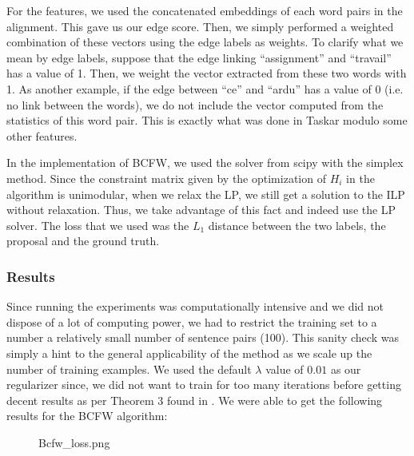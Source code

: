 For the features, we used the concatenated
embeddings of each word pairs in the alignment. This gave us our edge score.
Then, we simply performed a weighted combination of these vectors using the edge
labels as weights. To clarify what we mean by edge labels, suppose that the edge
linking ``assignment'' and ``travail'' has a value of 1. Then, we weight the
vector extracted from these two words with 1. As another example, if the edge
between ``ce'' and ``ardu'' has a value of 0 (i.e. no link between the words),
we do not include the vector computed from the statistics of this word pair.
This is exactly what was done in Taskar
\cite{taskarStructuredPredictionExtragradient} modulo some other features.

In the implementation of BCFW, we used the solver from scipy with the simplex
method. Since the constraint matrix given by the optimization of $H_i$ in the
algorithm is unimodular, when we relax the LP, we still get a solution to the
ILP without relaxation. Thus, we take advantage of this fact and indeed use the
LP solver. The loss that we used was the $L_1$
distance between the two labels, the proposal and the ground truth.

\subsubsection{Results}
Since running the experiments was computationally intensive and we did not
dispose of a lot of computing power, we had to restrict the training set to a
number a relatively small number of sentence pairs (100). This sanity check was
simply a hint to the general applicability of the method as we scale up the
number of training examples. We used the default $\lambda$ value of $0.01$ as
our regularizer since, we did not want to train for too many iterations before
getting decent results as per Theorem 3 found in
\citet{lacoste-julienBlockCoordinateFrankWolfeOptimization2013}. We were able to
get the following results for the BCFW algorithm:

\begin{figure}[htbp!]
  \caption{Bcfw_loss.png}
\end{figure} 



